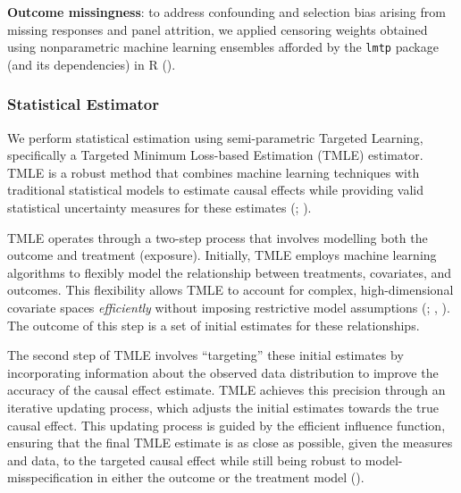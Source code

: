 \documentclass[
  single column]{article}
\begin{document}
\textbf{Outcome missingness}: to address confounding and selection bias
arising from missing responses and panel attrition, we applied censoring
weights obtained using nonparametric machine learning ensembles afforded
by the \texttt{lmtp} package (and its dependencies) in R
().

\subsubsection{Statistical Estimator}\label{statistical-estimator}

We perform statistical estimation using semi-parametric Targeted
Learning, specifically a Targeted Minimum Loss-based Estimation (TMLE)
estimator. TMLE is a robust method that combines machine learning
techniques with traditional statistical models to estimate causal
effects while providing valid statistical uncertainty measures for these
estimates (;
).

TMLE operates through a two-step process that involves modelling both
the outcome and treatment (exposure). Initially, TMLE employs machine
learning algorithms to flexibly model the relationship between
treatments, covariates, and outcomes. This flexibility allows TMLE to
account for complex, high-dimensional covariate spaces
\emph{efficiently} without imposing restrictive model assumptions
(;
,
). The outcome of this step is a set
of initial estimates for these relationships.

The second step of TMLE involves ``targeting'' these initial estimates
by incorporating information about the observed data distribution to
improve the accuracy of the causal effect estimate. TMLE achieves this
precision through an iterative updating process, which adjusts the
initial estimates towards the true causal effect. This updating process
is guided by the efficient influence function, ensuring that the final
TMLE estimate is as close as possible, given the measures and data, to
the targeted causal effect while still being robust to
model-misspecification in either the outcome or the treatment model
().
\end{document}
